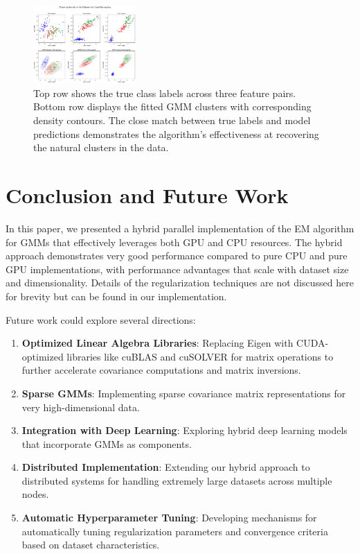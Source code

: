 \documentclass[conference]{IEEEtran}
\begin{document}
\begin{figure}[h!]
    \centering
    \includegraphics[width=0.35\textwidth]{iris1.png}
    \caption{Top row shows the true class labels across three feature pairs. Bottom row displays the fitted GMM clusters with corresponding density contours. The close match between true labels and model predictions demonstrates the algorithm's effectiveness at recovering the natural clusters in the data.}
    \label{fig:iris_results}
\end{figure}


\section{Conclusion and Future Work}
\label{conclusion}

In this paper, we presented a hybrid parallel implementation of the EM algorithm for GMMs that effectively leverages both GPU and CPU resources. The hybrid approach demonstrates very good performance compared to pure CPU and pure GPU implementations, with performance advantages that scale with dataset size and dimensionality. Details of the regularization techniques are not discussed here for brevity but can be found in our implementation.


Future work could explore several directions:
\begin{enumerate}
    \item \textbf{Optimized Linear Algebra Libraries}: Replacing Eigen with CUDA-optimized libraries like cuBLAS and cuSOLVER for matrix operations to further accelerate covariance computations and matrix inversions.
    
    \item \textbf{Sparse GMMs}: Implementing sparse covariance matrix representations for very high-dimensional data.
    
    \item \textbf{Integration with Deep Learning}: Exploring hybrid deep learning models that incorporate GMMs as components.
    
    \item \textbf{Distributed Implementation}: Extending our hybrid approach to distributed systems for handling extremely large datasets across multiple nodes.
    
    \item \textbf{Automatic Hyperparameter Tuning}: Developing mechanisms for automatically tuning regularization parameters and convergence criteria based on dataset characteristics.
\end{enumerate}
\end{document}
